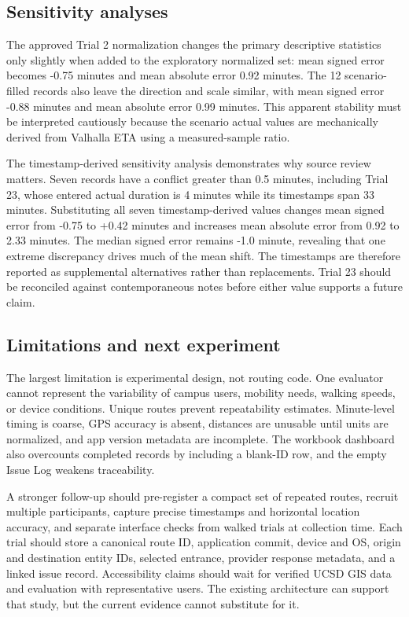 \documentclass[9pt,twocolumn]{article}
\begin{document}
\subsection{Sensitivity analyses}
The approved Trial 2 normalization changes the primary descriptive statistics only slightly when added to the exploratory normalized set: mean signed error becomes -0.75 minutes and mean absolute error 0.92 minutes. The 12 scenario-filled records also leave the direction and scale similar, with mean signed error -0.88 minutes and mean absolute error 0.99 minutes. This apparent stability must be interpreted cautiously because the scenario actual values are mechanically derived from Valhalla ETA using a measured-sample ratio.

The timestamp-derived sensitivity analysis demonstrates why source review matters. Seven records have a conflict greater than 0.5 minutes, including Trial 23, whose entered actual duration is 4 minutes while its timestamps span 33 minutes. Substituting all seven timestamp-derived values changes mean signed error from -0.75 to +0.42 minutes and increases mean absolute error from 0.92 to 2.33 minutes. The median signed error remains -1.0 minute, revealing that one extreme discrepancy drives much of the mean shift. The timestamps are therefore reported as supplemental alternatives rather than replacements. Trial 23 should be reconciled against contemporaneous notes before either value supports a future claim.

\subsection{Limitations and next experiment}
The largest limitation is experimental design, not routing code. One evaluator cannot represent the variability of campus users, mobility needs, walking speeds, or device conditions. Unique routes prevent repeatability estimates. Minute-level timing is coarse, GPS accuracy is absent, distances are unusable until units are normalized, and app version metadata are incomplete. The workbook dashboard also overcounts completed records by including a blank-ID row, and the empty Issue Log weakens traceability.

A stronger follow-up should pre-register a compact set of repeated routes, recruit multiple participants, capture precise timestamps and horizontal location accuracy, and separate interface checks from walked trials at collection time. Each trial should store a canonical route ID, application commit, device and OS, origin and destination entity IDs, selected entrance, provider response metadata, and a linked issue record. Accessibility claims should wait for verified UCSD GIS data and evaluation with representative users. The existing architecture can support that study, but the current evidence cannot substitute for it.
\end{document}
